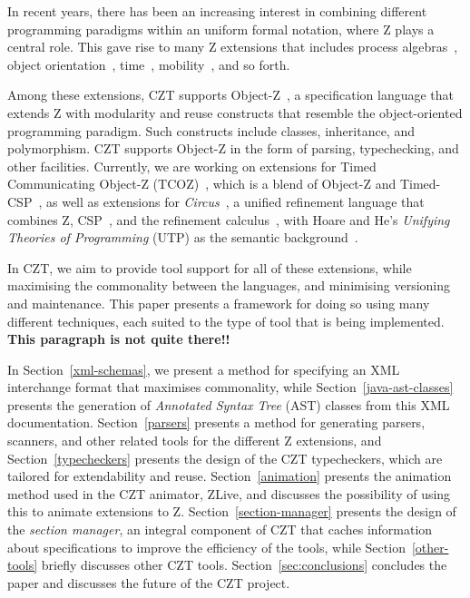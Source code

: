 \documentclass{llncs}
\newcommand{\Circus}{{\sf\slshape Circus}}
\begin{document}
  In recent years, there has been an increasing interest in combining
  different programming paradigms within an uniform formal notation,
  where Z plays a central role. This gave rise to many Z extensions that
  includes process algebras~\cite{fischer-1998,fischer-2000,circus.sem:intro},
  object orientation~\cite{oz,ohcircus}, time~\cite{tcoz,circus.sem:real.time2},
  mobility~\cite{circus.sem:mobility}, and so forth.

  Among these extensions, CZT supports Object-Z~\cite{oz}, a
  specification language that extends Z with modularity and reuse
  constructs that resemble the object-oriented programming
  paradigm. Such constructs include classes, inheritance, and
  polymorphism. CZT supports Object-Z in the form of parsing,
  typechecking, and other facilities.  Currently, we are working on
  extensions for Timed Communicating Object-Z (TCOZ)~\cite{tcoz},
  which is a blend of Object-Z and Timed-CSP~\cite{timed-csp}, as well
  as extensions for \Circus~\cite{circus.sem:intro}, a unified
  refinement language that combines Z, CSP~\cite{csp.books:roscoe},
  and the refinement calculus~\cite{fm.ref:morgan}, with Hoare and
  He's \textit{Unifying Theories of Programming} (UTP) as the semantic
  background~\cite{hoare.utp}.

  In CZT, we aim to provide tool support for all of these extensions,
  while maximising the commonality between the languages, and
  minimising versioning and maintenance. This paper presents a
  framework for doing so using many different techniques, each suited
  to the type of tool that is being implemented. {\bf This paragraph is
  not quite there!!}

  In Section~\ref{xml-schemas}, we present a method for specifying an
  XML interchange format that maximises commonality, while
  Section~\ref{java-ast-classes} presents the generation of
  \emph{Annotated Syntax Tree} (AST) classes from this XML
  documentation. Section~\ref{parsers} presents a method for
  generating parsers, scanners, and other related tools for the
  different Z extensions, and Section~\ref{typecheckers} presents
  the design of the CZT typecheckers, which are tailored for
  extendability and reuse. Section~\ref{animation} presents the
  animation method used in the CZT animator, ZLive, and discusses the
  possibility of using this to animate extensions to
  Z. Section~\ref{section-manager} presents the design of the {\em
  section manager}, an integral component of CZT that caches
  information about specifications to improve the efficiency of the
  tools, while Section~\ref{other-tools} briefly discusses other CZT
  tools. Section~\ref{sec:conclusions} concludes the paper and
  discusses the future of the CZT project.
\end{document}
